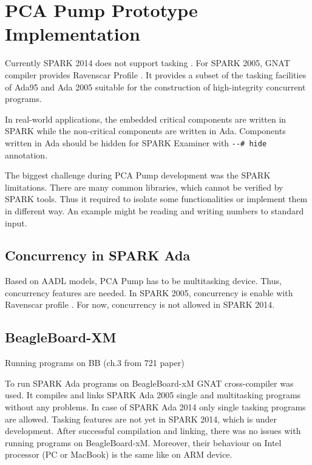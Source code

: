 
\cleardoublepage


\chapter{PCA Pump Prototype Implementation}
\label{pcapumpimpl}

Currently SPARK 2014 does not support tasking \cite{Spark2014refManual:Online}. For SPARK 2005, GNAT compiler provides Ravenscar Profile \cite{Ravenscar:Online}. It provides a subset of the tasking facilities of Ada95 and Ada 2005 suitable for the construction of high-integrity concurrent programs.

In real-world applications, the embedded critical components are written in SPARK while the non-critical components are written in Ada. Components written in Ada should be hidden for SPARK Examiner with \lstinline{--# hide} annotation.

The biggest challenge during PCA Pump development was the SPARK limitations. There are many common libraries, which cannot be verified by SPARK tools. Thus it required to isolate some functionalities or implement them in different way. An example might be reading and writing numbers to standard input.


\section{Concurrency in SPARK Ada}
\label{pcapump:implementation:concurrency}

Based on AADL models, PCA Pump has to be multitasking device. Thus, concurrency features are needed. In SPARK 2005, concurrency is enable with Ravenscar profile \cite{Ravenscar:Online}. For now, concurrency is not allowed in SPARK 2014.



\section{BeagleBoard-XM}
\label{pcapumpimpl:beagleboard}

Running programs on BB (ch.3 from 721 paper)

To run SPARK Ada programs on BeagleBoard-xM GNAT cross-compiler was used. It compiles and links SPARK Ada 2005 single and multitasking programs without any problems. In case of SPARK Ada 2014 only single tasking programs are allowed. Tasking features are not yet in SPARK 2014, which is under development. After successful compilation and linking, there was no issues with running programs on BeagleBoard-xM. Moreover, their behaviour on Intel processor (PC or MacBook) is the same like on ARM device.


